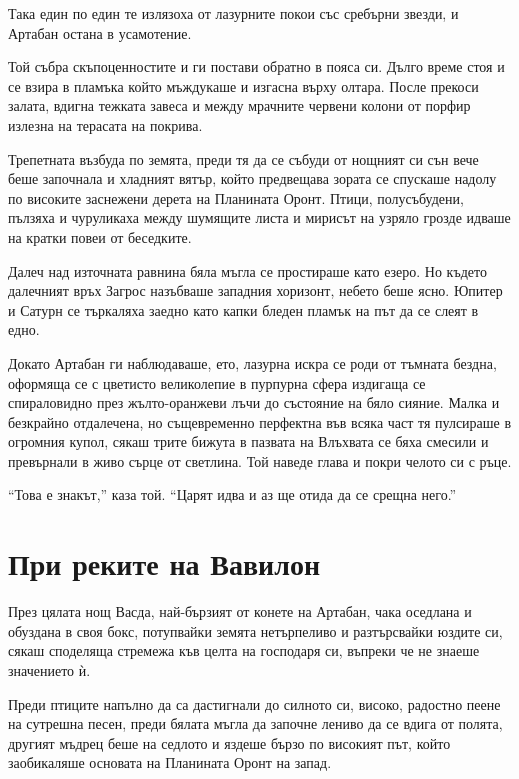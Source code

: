 \documentclass[oneside,10pt]{memoir}
\begin{document}
Така един по един те излязоха от лазурните покои със сребърни звезди, и
Артабан остана в усамотение.

Той събра скъпоценностите и ги постави обратно в пояса си. Дълго време стоя и се
взира в пламъка който мъждукаше и изгасна върху олтара. После прекоси залата,
вдигна тежката завеса и между мрачните червени колони от порфир излезна на
терасата на покрива.

Трепетната възбуда по земята, преди тя да се събуди от нощният си сън вече беше
започнала и хладният вятър, който предвещава зората се спускаше надолу по
високите заснежени дерета на Планината Оронт. Птици, полусъбудени, пълзяха и
чуруликаха между шумящите листа и мирисът на узряло грозде идваше на кратки
повеи от беседките.

Далеч над източната равнина бяла мъгла се простираше като езеро. Но където
далечният връх Загрос назъбваше западния хоризонт, небето беше ясно. Юпитер и
Сатурн се търкаляха заедно като капки бледен пламък на път да се слеят в едно.

Докато Артабан ги наблюдаваше, ето, лазурна искра се роди от тъмната бездна,
оформяща се с цветисто великолепие в пурпурна сфера издигаща се спираловидно
през жълто-оранжеви лъчи до състояние на бяло сияние. Малка и безкрайно
отдалечена, но същевременно перфектна във всяка част тя пулсираше в огромния
купол, сякаш трите бижута в пазвата на Влъхвата се бяха смесили и превърнали в
живо сърце от светлина. Той наведе глава и покри челото си с ръце.

``Това е знакът,'' каза той. ``Царят идва и аз ще отида да се срещна него.''

\part{При реките на Вавилон}

През цялата нощ Васда, най-бързият от конете на Артабан, чака оседлана и
обуздана в своя бокс, потупвайки земята нетърпеливо и разтърсвайки юздите си,
сякаш споделяща стремежа къв целта на господаря си, въпреки че не знаеше
значението ѝ.

Преди птиците напълно да са дастигнали до силното си, високо, радостно пеене на
сутрешна песен, преди бялата мъгла да започне лениво да се вдига от полята,
другият мъдрец беше на седлото и яздеше бързо по високият път, който заобикаляше
основата на Планината Оронт на запад.
\end{document}

